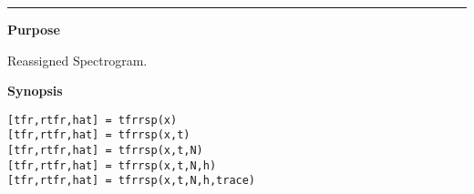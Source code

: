 

\hspace*{-1.6cm}{\Large \bf tfrrsp}

\vspace*{-.4cm}
\hspace*{-1.6cm}\rule[0in]{16.5cm}{.02cm}
\vspace*{.2cm}

{\bf \large {}\selectfont Purpose}\\
\hspace*{1.5cm}
\begin{minipage}[t]{13.5cm}
Reassigned Spectrogram.
\end{minipage}
\vspace*{.5cm}

{\bf \large {}\selectfont Synopsis}\\
\hspace*{1.5cm}
\begin{minipage}[t]{13.5cm}
\begin{verbatim}
[tfr,rtfr,hat] = tfrrsp(x) 
[tfr,rtfr,hat] = tfrrsp(x,t) 
[tfr,rtfr,hat] = tfrrsp(x,t,N) 
[tfr,rtfr,hat] = tfrrsp(x,t,N,h) 
[tfr,rtfr,hat] = tfrrsp(x,t,N,h,trace) 
\end{verbatim}
\end{minipage}
\vspace*{.5cm}

